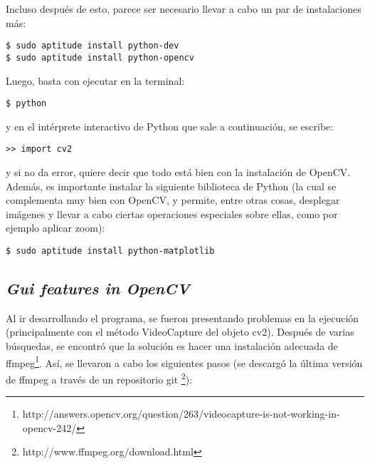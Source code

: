 \documentclass[letter]{article}
\begin{document}
Incluso después de esto, parece ser necesario llevar a cabo un par de instalaciones más:

\begin{lstlisting}
$ sudo aptitude install python-dev
$ sudo aptitude install python-opencv
\end{lstlisting}

Luego, basta con ejecutar en la terminal:

\begin{lstlisting}
$ python
\end{lstlisting}

y en el intérprete interactivo de Python que sale a continuación, se escribe:

\begin{lstlisting}
>> import cv2
\end{lstlisting}

y si no da error, quiere decir que todo está bien con la instalación de OpenCV.\\
Además, es importante instalar la siguiente biblioteca de Python (la cual se complementa muy bien con OpenCV, y permite, entre otras cosas, desplegar imágenes y llevar a cabo ciertas operaciones especiales sobre ellas, como por ejemplo aplicar zoom):

\begin{lstlisting}
$ sudo aptitude install python-matplotlib
\end{lstlisting}







\subsection{\normalsize \textit{Gui features in OpenCV}}


Al ir desarrollando el programa, se fueron presentando problemas en la ejecución (principalmente con el método VideoCapture del objeto cv2). Después de varias búsquedas, se encontró que la solución es hacer una instalación adecuada de ffmpeg\footnote{http://answers.opencv.org/question/263/videocapture-is-not-working-in-opencv-242/}. Así, se llevaron a cabo los siguientes pasos (se descargó la última versión de ffmpeg a través de un repositorio git \footnote{http://www.ffmpeg.org/download.html}):
\end{document}
